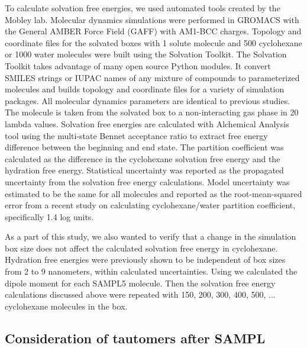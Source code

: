 To calculate solvation free energies, we used automated tools created by the Mobley lab.
Molecular dynamics simulations were performed in GROMACS with the General AMBER Force Field (GAFF) with AM1-BCC charges. 
Topology and coordinate files for the solvated boxes with 1 solute molecule and 500 cyclohexane or 1000 water molecules were built using the Solvation Toolkit. %
The Solvation Toolkit takes advantage of many open source Python modules.
It convert SMILES strings or IUPAC names of any mixture of compounds to parameterized molecules and builds topology and coordinate files for a variety of simulation packages. 
All molecular dynamics parameters are identical to previous studies.  %
The molecule is taken from the solvated box to a non-interacting gas phase in 20 lambda values. 
Solvation free energies are calculated with Alchemical Analysis tool %
using the multi-state Bennet acceptance ratio to extract free energy difference between the beginning and end state. 
The partition coefficient was calculated as the difference in the cyclohexane solvation free energy and the hydration free energy.
Statistical uncertainty was reported as the propagated uncertainty from the solvation free energy calculations. 
Model uncertainty was estimated to be the same for all molecules and reported as the root-mean-squared error from a recent study on calculating cyclohexane/water partition coefficient, specifically 1.4 log units.

As a part of this study, we also wanted to verify that a change in the simulation box size does not affect the calculated solvation free energy in cyclohexane. 
Hydration free energies were previously shown to be independent of box sizes from 2 to 9 nanometers, within calculated uncertainties. %
Using %
we calculated the dipole moment for each SAMPL5 molecule. 
Then the solvation free energy calculations discussed above were repeated with 150, 200, 300, 400, 500, ... %
cyclohexane molecules in the box. 

\subsection{Consideration of tautomers after SAMPL}
\label{methods:3}

